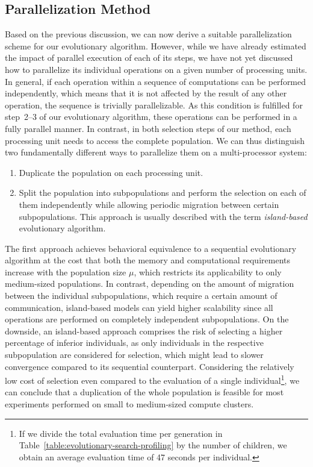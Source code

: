\subsection{Parallelization Method}
Based on the previous discussion, we can now derive a suitable parallelization scheme for our evolutionary algorithm.
However, while we have already estimated the impact of parallel execution of each of its steps, we have not yet discussed how to parallelize its individual operations on a given number of processing units. 
In general, if each operation within a sequence of computations can be performed independently, which means that it is not affected by the result of any other operation, the sequence is trivially parallelizable.
As this condition is fulfilled for step~2--3 of our evolutionary algorithm, these operations can be performed in a fully parallel manner.
In contrast, in both selection steps of our method, each processing unit needs to access the complete population.
We can thus distinguish two fundamentally different ways to parallelize them on a multi-processor system:
\begin{enumerate}
	\item Duplicate the population on each processing unit.
	\item Split the population into subpopulations and perform the selection on each of them independently while allowing periodic migration between certain subpopulations. This approach is usually described with the term \emph{island-based} evolutionary algorithm.
\end{enumerate}   
The first approach achieves behavioral equivalence to a sequential evolutionary algorithm at the cost that both the memory and computational requirements increase with the population size $\mu$, which restricts its applicability to only medium-sized populations.
In contrast, depending on the amount of migration between the individual subpopulations, which require a certain amount of communication, island-based models can yield higher scalability since all operations are performed on completely independent subpopulations.
On the downside, an island-based approach comprises the risk of selecting a higher percentage of inferior individuals, as only individuals in the respective subpopulation are considered for selection, which might lead to slower convergence compared to its sequential counterpart.
Considering the relatively low cost of selection even compared to the evaluation of a single individual\footnote{If we divide the total evaluation time per generation in Table~\ref{table:evolutionary-search-profiling} by the number of children, we obtain an average evaluation time of 47 seconds per individual.}, we can conclude that a duplication of the whole population is feasible for most experiments performed on small to medium-sized compute clusters.
